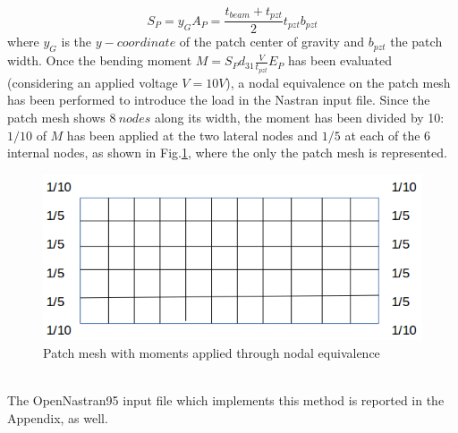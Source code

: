 \documentclass[twocolumn,a4paper,10pt,english]{article}
\begin{document}
	    \begin{equation}
	    	S_P=y_GA_P=\frac{t_{beam}+t_{pzt}}{2}t_{pzt}b_{pzt}
	    \end{equation}
	    where $y_G$ is the $y-coordinate$ of the patch center of gravity and $b_{pzt}$ the patch width. Once the bending moment $M=S_Pd_{31}\frac{V}{t_{pzt}} E_P$ has been evaluated (considering an applied voltage $V=10V$), a nodal equivalence on the patch mesh has been performed to introduce the load in the Nastran input file. Since the patch mesh shows $8~nodes$ along its width, the moment has been divided by 10: $1/10$ of $M$ has been applied at the two lateral nodes and $1/5$ at each of the 6 internal nodes, as shown in Fig.\ref{fig:patch}, where the only the patch mesh is represented.
	    \begin{figure}[htp]
	    	\centering
	    	\includegraphics[width=0.6\linewidth]{images/patch.png}
	    	\caption{Patch mesh with moments applied through nodal equivalence}
	    	\label{fig:patch}
	    \end{figure}\\
	    The OpenNastran95 input file which implements this method is reported in the Appendix, as well.
	    
    
       
\end{document}
